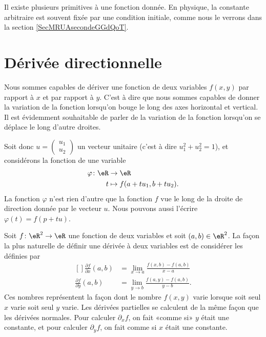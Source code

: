 \begin{normaltext}
    Il existe plusieurs primitives à une fonction donnée. En physique, la constante arbitraire est souvent fixée par une condition initiale, comme nous le verrons dans la section \ref{SecMRUAsecondeGGdQoT}.
\end{normaltext}


\section{Dérivée directionnelle}

Nous sommes capables de dériver une fonction de deux variables $f(x,y)$ par rapport à $x$ et par rapport à $y$. C'est à dire que nous sommes capables de donner la variation de la fonction lorsqu'on bouge le long des axes horizontal et vertical. Il est évidemment souhaitable de parler de la variation de la fonction lorsqu'on se déplace le long d'autre droites.

Soit donc $u=\begin{pmatrix}
    u_1    \\ 
    u_2    
\end{pmatrix}$ un vecteur unitaire (c'est à dire $u_1^2+u_2^2=1$), et considérons la fonction de une variable
\begin{equation}
    \begin{aligned}
        \varphi\colon \eR&\to \eR \\
        t&\mapsto f(a+tu_1,b+tu_2). 
    \end{aligned}
\end{equation}
La fonction $\varphi$ n'est rien d'autre que la fonction $f$ vue le long de la droite de direction donnée par le vecteur $u$. Nous pouvons aussi l'écrire $\varphi(t)=f(p+tu)$.

Soit $f\colon \eR^2\to \eR$ une fonction de deux variables et soit $(a,b)\in\eR^2$. La façon la plus naturelle de définir une dérivée à deux variables est de considérer les  définies par
\begin{equation}
    \begin{aligned}[]
        \frac{ \partial f }{ \partial x }(a,b)&=\lim_{x\to a} \frac{ f(x,b)-f(a,b) }{ x-a }\\
        \frac{ \partial f }{ \partial y }(a,b)&=\lim_{y\to b} \frac{ f(a,y)-f(a,b) }{y-b}.
    \end{aligned}
\end{equation}
Ces nombres représentent la façon dont le nombre $f(x,y)$ varie lorsque soit seul $x$ varie soit seul $y$ varie. Les dérivées partielles se calculent de la même façon que les dérivées normales. Pour calculer $\partial_xf$, on fait «comme si» $y$ était une constante, et pour calculer $\partial_yf$, on fait comme si $x$ était une constante.

